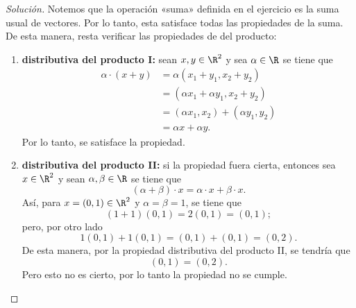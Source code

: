 \documentclass[a4,11pt]{aleph-notas}
\begin{document}
\begin{proof}[Solución]\hspace{0pt}
    Notemos que la operación «suma» definida en el ejercicio es la suma usual de vectores. Por lo tanto, esta satisface todas las propiedades de la suma. De esta manera, resta verificar las propiedades de del producto:
    \begin{enumerate}
    \item \textbf{distributiva del producto I:}
        sean $x,y\in \R^2$ y sea $\alpha\in \R$ se tiene que
        \begin{align*}
            \alpha\cdot (x + y) & = \alpha (x_1+y_1 , x_2 + y_2) \\
                & = (\alpha x_1 + \alpha y_1 , x_2 + y_2 ) \\
                & = (\alpha x_1,x_2) + (\alpha y_1,y_2) \\
                & = \alpha x + \alpha y.
        \end{align*}
        Por lo tanto, se satisface la propiedad.
    \item \textbf{distributiva del producto II:}
        si la propiedad fuera cierta, entonces sea $x\in \R^2$ y sean $\alpha,\beta\in \R$ se tiene que
        \[
            (\alpha+\beta)\cdot x=\alpha\cdot x + \beta\cdot x.
        \]
        Así, para $x=(0,1)\in\R^2$ y $\alpha=\beta=1$, se tiene que 
        \[
            (1 + 1)(0,1) = 2(0,1) = (0,1);
        \]
        pero, por otro lado 
        \[
            1 (0,1) + 1(0,1) = (0,1)+(0,1) = (0,2).
        \]
        De esta manera, por la propiedad distributiva del producto II, se tendría que 
        \[
            (0,1) = (0,2).
        \]
        Pero esto no es cierto, por lo tanto la propiedad no se cumple. 
        

\end{enumerate}
\end{proof}
\end{document}
